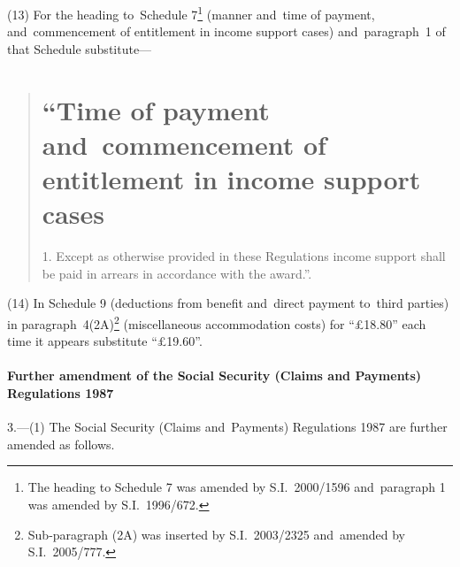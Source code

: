 \documentclass[12pt,a4paper]{article}
\begin{document}
(13) For the heading to~Schedule 7\footnote{The heading to Schedule 7 was amended by S.I.~2000/1596 and~paragraph 1 was amended by S.I.~1996/672.} (manner and~time of payment, and~commencement of entitlement in income support cases) and~paragraph~1 of that Schedule substitute—
\begin{quotation}
\part*{\noindent “Time of payment and~commencement of entitlement in income support cases}

1.  Except as otherwise provided in these Regulations income support shall be paid in arrears in accordance with the award.”.
\end{quotation}

(14) In Schedule 9 (deductions from benefit and~direct payment to~third parties) in paragraph~4(2A)\footnote{Sub-paragraph (2A) was inserted by S.I.~2003/2325 and~amended by S.I.~2005/777.} (miscellaneous accommodation costs) for “£18$.$80” each time it appears substitute “£19$.$60”.

\subsection[3. Further amendment of the Social Security (Claims and~Payments) Regulations 1987]{Further amendment of the Social Security (Claims and Payments) Regulations 1987}

3.---(1)  The Social Security (Claims and~Payments) Regulations 1987 are further amended as follows.
\end{document}
